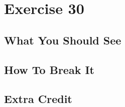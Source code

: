 \chapter{Exercise 30}


\section{What You Should See}


\section{How To Break It}


\section{Extra Credit}



